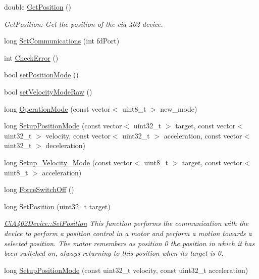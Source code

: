 \begin{DoxyCompactItemize}
double \hyperlink{classCiA402Device_ac8d9e36e6f457565cac7d26d91e4a712}{Get\+Position} ()
\begin{DoxyCompactList}\small\item\em Get\+Position\+: Get the position of the cia 402 device. \end{DoxyCompactList}\item 
long \hyperlink{classCiA402Device_abf511a7d44b62ac93ae18fe21f8d51c9}{Set\+Communications} (int fd\+Port)
\item 
int \hyperlink{classCiA402Device_af1ed15805579e85e514e7ccf4ff21e10}{Check\+Error} ()
\item 
bool \hyperlink{classCiA402Device_a8c09be8df402061e170ca297a7ee6cfe}{set\+Position\+Mode} ()
\item 
bool \hyperlink{classCiA402Device_a4abf9605004db99567ede3370e1d0a4d}{set\+Velocity\+Mode\+Raw} ()
\item 
long \hyperlink{classCiA402Device_a49f298cf0d4d2d68007b3cb396e93a17}{Operation\+Mode} (const vector$<$ uint8\+\_\+t $>$ new\+\_\+mode)
\item 
long \hyperlink{classCiA402Device_abca4743b617d109a915215193bd06fbe}{Setup\+Position\+Mode} (const vector$<$ uint32\+\_\+t $>$ target, const vector$<$ uint32\+\_\+t $>$ velocity, const vector$<$ uint32\+\_\+t $>$ acceleration, const vector$<$ uint32\+\_\+t $>$ deceleration)
\item 
long \hyperlink{classCiA402Device_a42e8505120ada57ea8292902ce9f9c5e}{Setup\+\_\+\+Velocity\+\_\+\+Mode} (const vector$<$ uint8\+\_\+t $>$ target, const vector$<$ uint8\+\_\+t $>$ acceleration)
\item 
long \hyperlink{classCiA402Device_aff0503b4caa6d2a8e2e66df6b9e0f4e4}{Force\+Switch\+Off} ()
\item 
long \hyperlink{classCiA402Device_acb2d6cc96a8a613f9c2791e87344ba0d}{Set\+Position} (uint32\+\_\+t target)
\begin{DoxyCompactList}\small\item\em \hyperlink{classCiA402Device_acb2d6cc96a8a613f9c2791e87344ba0d}{Ci\+A402\+Device\+::\+Set\+Position} This function performs the communication with the device to perform a position control in a motor and perform a motion towards a selected position. The motor remembers as position 0 the position in which it has been switched on, always returning to this position when its target is 0. \end{DoxyCompactList}\item 
long \hyperlink{classCiA402Device_a221dbc5461823097981727a3baff5d0c}{Setup\+Position\+Mode} (const uint32\+\_\+t velocity, const uint32\+\_\+t acceleration)

\end{DoxyCompactItemize}
